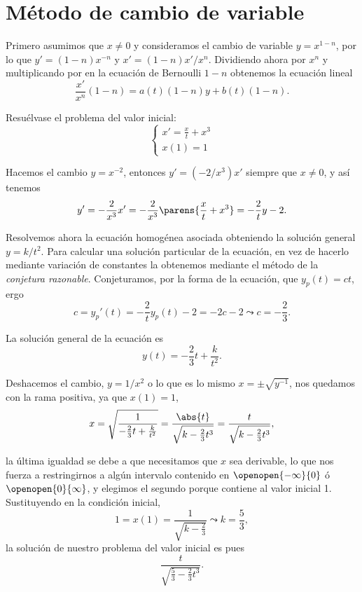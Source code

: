 \documentclass[../main.tex]{subfiles}
\begin{document}
\section{Método de cambio de variable}

Primero asumimos que \(x \neq 0\) y consideramos el cambio de variable
\(y = x^{1 - n}\), por lo que \(y' = (1 - n) x^{-n}\) y \(x' = (1 - n)x'/x^n\).
Dividiendo ahora por \(x^n\) y multiplicando por en la ecuación de Bernoulli
\(1 - n\) obtenemos la ecuación lineal
\[\frac{x'}{x^n}(1 - n) = a(t)(1 - n)y + b(t)(1 - n).\]

\begin{example}
\label{ex:cambio_var}
	Resuélvase el problema del valor inicial:
	\[\begin{cases}
			x' = \frac{x}{t} + x^3 \\
			x(1) = 1
	  \end{cases}\]
\end{example}

\begin{solution}
	Hacemos el cambio \(y = x^{-2}\), entonces \(y' = (-2/x^3) x'\) siempre que
	\(x \neq 0\), y así tenemos
	\[y' = -\frac{2}{x^3} x' = -\frac{2}{x^3}\parens{\frac{x}{t} + x^3} = 
		-\frac{2}{t}y - 2.\]
	
      Resolvemos ahora la ecuación homogénea asociada obteniendo la solución
      general \(y = k/t^2\). Para calcular una solución particular de la
      ecuación, en vez de hacerlo mediante variación de constantes la obtenemos
      mediante el método de la \emph{conjetura razonable}. Conjeturamos, por la
      forma de la ecuación, que \(y_p(t) = ct\), ergo
	\[c = y_p'(t) = -\frac{2}{t} y_p(t) - 2 = -2c -2 
		\leadsto c = -\frac{2}{3}.\]
	
	La solución general de la ecuación es
	\[y(t) = -\frac{2}{3}t + \frac{k}{t^2}.\]

	Deshacemos el cambio, \(y = 1/x^2\) o lo que es lo mismo
	\(x = \pm \sqrt{y^{-1}}\), nos quedamos con la rama positiva, ya que 
	\(x(1) = 1\),
	\[x = \sqrt{\frac{1}{-\frac{2}{3}t + \frac{k}{t^2}}} =
      \frac{\abs{t}}{\sqrt{k - \frac{2}{3}t^3}} = \frac{t}{\sqrt{k -
          \frac{2}{3}t^3}},\]

    la última igualdad se debe a que necesitamos que \(x\) sea derivable, lo que
    nos fuerza a restringirnos a algún intervalo contenido en
    \(\openopen{-\infty}{0}\) ó \(\openopen{0}{\infty}\), y elegimos el segundo
    porque contiene al valor inicial 1.  Sustituyendo en la condición inicial,
	\[1 = x(1) = \frac{1}{\sqrt{k - \frac{2}{3}}} \leadsto k = \frac{5}{3},\]
	la solución de nuestro problema del valor inicial es pues
	\[\frac{t}{\sqrt{\frac{5}{3} - \frac{2}{3}t^3}}.\]
\end{solution}
\end{document}
